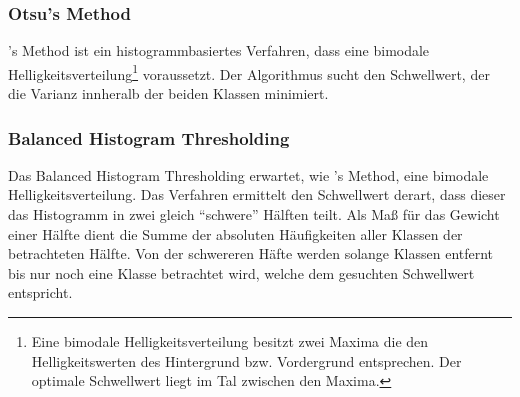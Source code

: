 \subsubsection*{Otsu's Method}
's Method ist ein histogrammbasiertes Verfahren, dass eine bimodale Helligkeitsverteilung\footnote{Eine bimodale Helligkeitsverteilung besitzt zwei Maxima die den Helligkeitswerten des Hintergrund bzw. Vordergrund entsprechen. Der optimale Schwellwert liegt im Tal zwischen den Maxima.} voraussetzt.
Der Algorithmus sucht den Schwellwert, der die Varianz innheralb der beiden Klassen minimiert.

\subsubsection*{Balanced Histogram Thresholding}
Das Balanced Histogram Thresholding erwartet, wie 's Method, eine bimodale Helligkeitsverteilung.
Das Verfahren ermittelt den Schwellwert derart, dass dieser das Histogramm in zwei gleich "`schwere"' Hälften teilt.
Als Maß für das Gewicht einer Hälfte dient die Summe der absoluten Häufigkeiten aller Klassen der betrachteten Hälfte.
Von der schwereren Häfte werden solange Klassen entfernt bis nur noch eine Klasse betrachtet wird, welche dem gesuchten Schwellwert entspricht.
